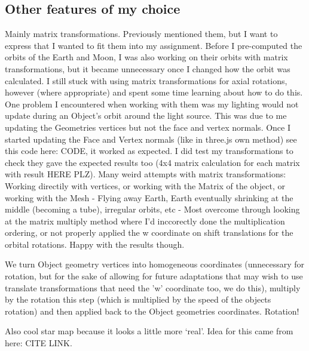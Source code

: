\documentclass[12pt]{article}
\begin{document}
\subsection{Other features of my choice}
Mainly matrix transformations. Previously mentioned them, but I want to express that I wanted to fit them into my assignment. Before I pre-computed the orbits of the Earth and Moon, I was also working on their orbits with matrix transformations, but it became unnecessary once I changed how the orbit was calculated. I still stuck with using matrix transformations for axial rotations, however (where appropriate) and spent some time learning about how to do this. One problem I encountered when working with them was my lighting would not update during an Object's orbit around the light source. This was due to me updating the Geometries vertices but not the face and vertex normals. Once I started updating the Face and Vertex normals (like in three.js own method) see this code here: CODE, it worked as expected. I did test my transformations to check they gave the expected results too (4x4 matrix calculation for each matrix with result HERE PLZ). Many weird attempts with matrix transformations: Working directily with vertices, or working with the Matrix of the object, or working with the Mesh - Flying away Earth, Earth eventually shrinking at the middle (becoming a tube), irregular orbits, etc - Most overcome through looking at the matrix multiply method where I'd inccorectly done the multiplication ordering, or not properly applied the w coordinate on shift translations for the orbital rotations. Happy with the results though.

We turn Object geometry vertices into homogeneous coordinates (unnecessary for rotation, but for the sake of allowing for future adaptations that may wish to use translate transformations that need the 'w' coordinate too, we do this), multiply by the rotation this step (which is multiplied by the speed of the objects rotation) and then applied back to the Object geometries coordinates. Rotation!

 Also cool star map because it looks a little more `real'. Idea for this came from here: CITE LINK.

\end{document}
